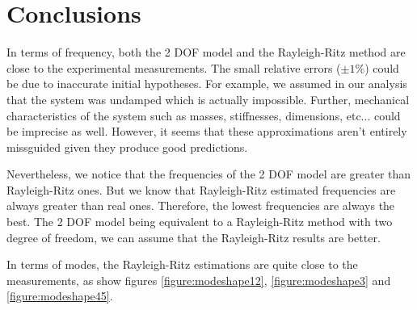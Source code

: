 \documentclass[a4paper, 12pt]{article}
\begin{document}
	\section*{Conclusions}
	In terms of frequency, both the 2 DOF model and the Rayleigh-Ritz method are close to the experimental measurements. The small relative errors ($\pm 1 \%$) could be due to inaccurate initial hypotheses. For example, we assumed in our analysis that the system was undamped which is actually impossible. Further, mechanical characteristics of the system such as masses, stiffnesses, dimensions, etc... could be imprecise as well. However, it seems that these approximations aren't entirely missguided given they produce good predictions. \par
	Nevertheless, we notice that the frequencies of the 2 DOF model are greater than Rayleigh-Ritz ones. But we know that Rayleigh-Ritz estimated frequencies are always greater than real ones. Therefore, the lowest frequencies are always the best. The 2 DOF model being equivalent to a Rayleigh-Ritz method with two degree of freedom, we can assume that the Rayleigh-Ritz results are better. \par
	In terms of modes, the Rayleigh-Ritz estimations are quite close to the measurements, as show figures \ref{figure:modeshape12}, \ref{figure:modeshape3} and \ref{figure:modeshape45}.
\end{document}
